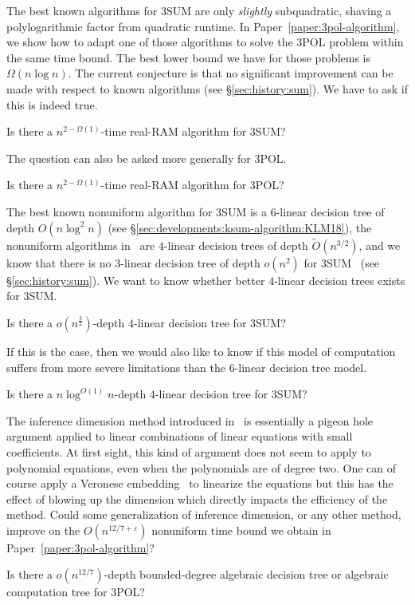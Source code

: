 The best known algorithms for 3SUM are only \emph{slightly} subquadratic,
shaving a polylogarithmic factor from quadratic runtime.
In Paper~\ref{paper:3pol-algorithm}, we show how to adapt one of those
algorithms to solve the 3POL problem within the same time bound.
%
The best lower bound we have for those problems is \(\Omega(n \log n)\). The
current conjecture is that no significant improvement can be made with respect
to known algorithms (see
\S\ref{sec:history:sum}).
%
We have to ask if this is indeed true.
\begin{openquestion}
	Is there a \(n^{2-\Omega(1)}\)-time real-RAM algorithm for 3SUM?
\end{openquestion}

The question can also be asked more generally for 3POL.
\begin{openquestion}
	Is there a \(n^{2-\Omega(1)}\)-time real-RAM algorithm for 3POL?
\end{openquestion}

The best known nonuniform algorithm for 3SUM is a \(6\)-linear decision tree of
depth \(O(n \log^2 n)\) (see \S\ref{sec:developments:ksum-algorithm:KLM18}),
the nonuniform algorithms in~\cite{GP18,Fr15,GS15} are
\(4\)-linear decision trees of depth \( \tilde{O}(n^{3/2}) \), and we know that
there is no \(3\)-linear decision tree of depth \(o(n^2)\) for
3SUM~\cite{Er99a} (see \S\ref{sec:history:sum}).
We want to know whether better \(4\)-linear decision trees exists for 3SUM.
\begin{openquestion}
	Is there a \(o(n^{\frac 32})\)-depth \(4\)-linear decision tree for 3SUM?
\end{openquestion}

If this is the case, then we would also like to know if this model of
computation suffers from more severe limitations than the \(6\)-linear decision tree
model.
\begin{openquestion}
	Is there a \(n \log^{O(1)} n\)-depth \(4\)-linear decision tree for 3SUM?
\end{openquestion}

The inference dimension method introduced in~\cite{KLM18} is essentially a
pigeon hole argument applied to linear combinations of linear equations with small coefficients.
At first sight, this kind of argument does not seem to apply to polynomial
equations, even when the polynomials are of degree two. One can of course apply
a Veronese embedding~\cite{Har77,Har13} to linearize the equations but this has
the effect of blowing up the dimension which directly impacts the efficiency of
the method. Could some generalization of inference dimension, or any other
method,
improve on the \(O(n^{12/7 + \varepsilon})\) nonuniform time bound we obtain in
Paper~\ref{paper:3pol-algorithm}?
\begin{openquestion}
	Is there a \(o(n^{12/7})\)-depth bounded-degree algebraic decision tree or
	algebraic computation tree for 3POL?
\end{openquestion}

